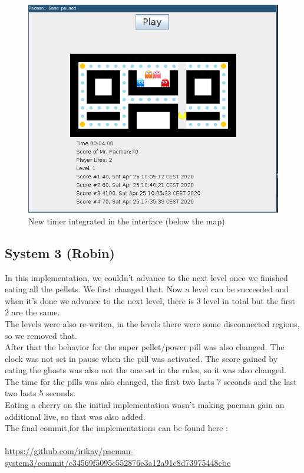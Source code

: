 \documentclass[]{article}
\begin{document}
\begin{figure}[h]
\centering
\includegraphics[width=0.6\linewidth]{S2-screen_timer}
\caption{New timer integrated in the interface (below the map)}
\label{fig:S2_timer}
\end{figure}

\newpage

\subsection{System 3 (Robin)}

\indent\par In this implementation, we couldn't advance to the next level once we finished eating all the pellets.  We first changed that. Now a level can be succeeded and when it's done we advance to the next level, there is 3 level in total but the first 2 are the same.
\\

The levels were also re-writen, in the levels there were some disconnected regions, so we removed that. 
\\

After that the behavior for the super pellet/power pill was also changed. The clock was not set in pause when the pill was activated. The score gained by eating the ghosts was also not the one set in the rules, so it was also changed. The time for the pills was also changed, the first two lasts 7 seconds and the last two lasts 5 seconds.
\\

Eating a cherry on the initial implementation wasn't making pacman gain an additional live, so that was also added. \\

The final commit,for the implementations can be found here :\\~\\
\url{https://github.com/irikay/pacman-system3/commit/c34569f5095c552876e3a12a91c8d73975448cbe}
\end{document}
